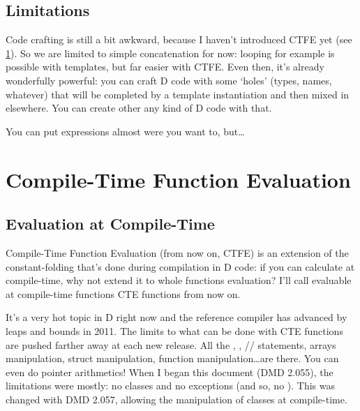 \subsection{Limitations}\label{stringmixinslimitations}

Code crafting is still a bit awkward, because I haven't introduced CTFE yet (see \ref{ctfe}). So we are limited to simple concatenation for now: looping for example is possible with templates, but far easier with CTFE. Even then, it's already wonderfully powerful: you can craft D code with some `holes' (types, names, whatever) that will be completed by a template instantiation and then mixed in elsewhere. You can create other any kind of D code with that.

You can put \DD{()} expressions almost were you want to, but\ldots




\section{Compile-Time Function Evaluation} \label{ctfe}

\subsection{Evaluation at Compile-Time} \label{compiletimeevaluation}

Compile-Time Function Evaluation (from now on, CTFE) is an extension of the constant-folding that's done during compilation in D code: if you can calculate  at compile-time, why not extend it to whole functions evaluation? I'll call evaluable at compile-time functions CTE functions from now on.

It's a very hot topic in D right now and the reference compiler has advanced by leaps and bounds in 2011. The limits to what can be done with CTE functions are pushed farther away at each new release.  All the , , // statements, arrays manipulation, struct manipulation, function manipulation\ldots are there. You can even do pointer arithmetics! When I began this document (DMD 2.055), the limitations were mostly: no classes and no exceptions (and so, no ). This was changed with DMD 2.057, allowing the manipulation of classes at compile-time.

